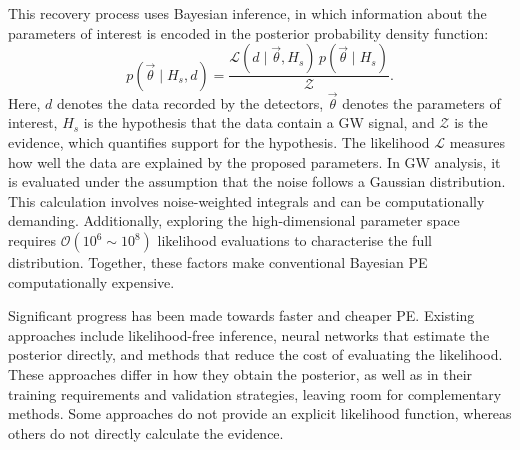 \documentclass[11pt,a4paper]{article}
\begin{document}
This recovery process uses Bayesian inference, in which information about the parameters of interest is encoded in the posterior probability density function:
\begin{equation}
  p(\vec{\theta} \mid H_s, d)
  =
  \frac{
    \mathcal{L}(d \mid \vec{\theta}, H_s)\,
    p(\vec{\theta} \mid H_s)
  }{
    \mathcal{Z}
  }.
  \tag{1}
  \label{eq:bayes}
\end{equation}
Here, $d$ denotes the data recorded by the detectors, $\vec{\theta}$ denotes the parameters of interest, $H_s$ is the hypothesis that the data contain a GW signal, and $\mathcal{Z}$ is the evidence, which quantifies support for the hypothesis. The likelihood $\mathcal{L}$ measures how well the data are explained by the proposed parameters. In GW analysis, it is evaluated under the assumption that the noise follows a Gaussian distribution. This calculation involves noise-weighted integrals and can be computationally demanding. Additionally, exploring the high-dimensional parameter space requires $\mathcal{O}(10^{6}\sim10^{8})$ likelihood evaluations to characterise the full distribution. Together, these factors make conventional Bayesian PE computationally expensive.\cite{veitch2015}

Significant progress has been made towards faster and cheaper PE. Existing approaches include likelihood-free inference, neural networks that estimate the posterior directly, and methods that reduce the cost of evaluating the likelihood.\cite{zackay2018,dax2021,graff2012} These approaches differ in how they obtain the posterior, as well as in their training requirements and validation strategies, leaving room for complementary methods. Some approaches do not provide an explicit likelihood function, whereas others do not directly calculate the evidence.
\end{document}
